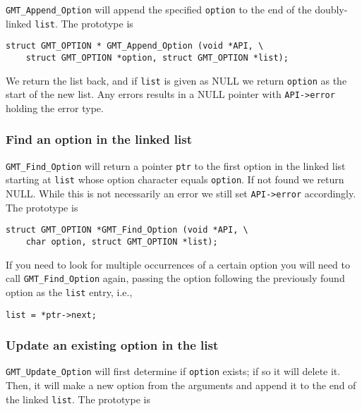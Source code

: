 \documentclass[11pt]{report}
\begin{document}
\texttt{GMT\_Append\_Option} will append the specified \texttt{option} to the end
of the doubly-linked \texttt{list}.  The prototype is

\begin{verbatim}
struct GMT_OPTION * GMT_Append_Option (void *API, \
    struct GMT_OPTION *option, struct GMT_OPTION *list);
\end{verbatim}
We return the list back, and if \texttt{list} is given as NULL we return \texttt{option} as the start of the new list.
Any errors results in a NULL pointer with \texttt{API->error} holding the error type.

\subsubsection{Find an option in the linked list}

\texttt{GMT\_Find\_Option} will return a pointer \texttt{ptr} to the first option in the linked list starting
at \texttt{list} whose option character equals \texttt{option}.  If not found we return NULL.  While this is
not necessarily an error we still set \texttt{API->error} accordingly.
The prototype is

\begin{verbatim}
struct GMT_OPTION *GMT_Find_Option (void *API, \
    char option, struct GMT_OPTION *list);
\end{verbatim}
If you need to look for multiple occurrences of a certain option you will need to
call \texttt{GMT\_Find\_Option} again, passing the option following the
previously found option as the \texttt{list} entry, i.e.,

\begin{verbatim}
list = *ptr->next;
\end{verbatim}

\subsubsection{Update an existing option in the list}
\index{Option!Update}

\texttt{GMT\_Update\_Option} will first determine if \texttt{option} exists;
if so it will delete it. Then, it will make a new option from the arguments
and append it to the end of the linked \texttt{list}.  The prototype is
\index{GMT\_Update\_Option}
\end{document}
